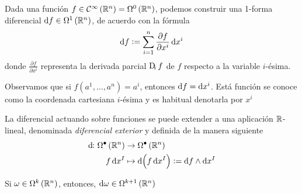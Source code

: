 \begin{defi}
   Dada una función $f \in \mathcal{C}^\infty \left( \mathbb{R}^n \right) = \Omega^0 \left( \mathbb{R}^n \right)$, podemos construir una 1-forma diferencial
   $\dif f \in \Omega^1 \left( \real^n \right)$, de acuerdo con la fórmula
   \[
       \dif f := \sum^n_{i=1} \frac{\partial f}{\partial x^i} \dif x^i
   \]
   donde $\frac{\partial f}{\partial x^i}$ representa la derivada parcial $\Dif_i f$ de $f$ respecto a la variable $i$-\'esima.
\end{defi}

\begin{obs}
    Observamos que si $f \left( a^1, \dots, a^n \right) = a^i$, entonces $\dif f = \dif x^i$. Está función se conoce como la coordenada
    cartesiana $i$-\'esima y es habitual denotarla por $x^i$
\end{obs}

\begin{defi}
    La diferencial actuando sobre funciones se puede extender a una aplicación $\mathbb{R}$-lineal, denominada \emph{diferencial exterior} y definida
    de la manera siguiente
    \[
        \begin{aligned}
            \dif \colon \Omega^\bullet \left( \real^n \right) &\to \Omega^\bullet \left( \real^n \right)\\
            f \dif x^I &\mapsto \dif\left( f \dif x^I \right) := \dif f \wedge \dif x^I
        \end{aligned}
    \]
\end{defi}

\begin{obs*}
    Si $\omega \in \Omega^k \left( \mathbb{R}^n \right)$, entonces, $\dif \omega \in \Omega^{k+1} \left( \real^n \right)$
\end{obs*}

